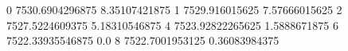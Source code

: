 0 7530.6904296875 8.35107421875
1 7529.916015625 7.57666015625
2 7527.5224609375 5.18310546875
4 7523.92822265625 1.5888671875
6 7522.33935546875 0.0
8 7522.7001953125 0.36083984375
